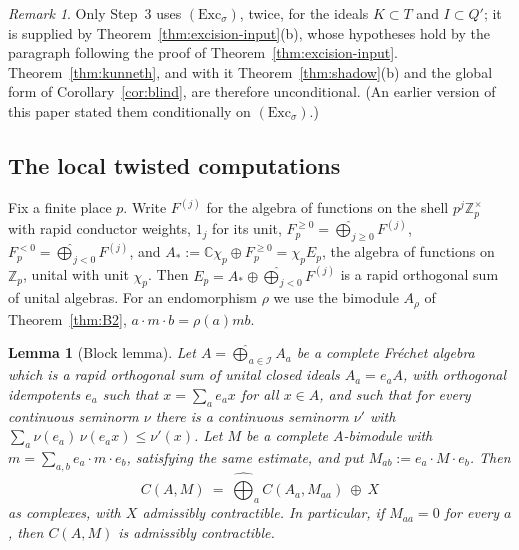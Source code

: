 \documentclass[11pt]{amsart}
\newtheorem{lemma}[theorem]{Lemma}
\theoremstyle{definition}
\theoremstyle{remark}
\newtheorem{remark}[theorem]{Remark}
\newcommand{\C}{\mathbb C}
\newcommand{\Z}{\mathbb Z}
\begin{document}
\begin{remark}\label{rem:kunnethstatus}
Only Step~3 uses $(\mathrm{Exc}_{\sigma})$, twice, for the ideals $K\subset T$
and $I\subset Q'$; it is supplied by Theorem~\ref{thm:excision-input}(b), whose
hypotheses hold by the paragraph following the proof of Theorem~\ref{thm:excision-input}.  Theorem~\ref{thm:kunneth}, and
with it Theorem~\ref{thm:shadow}(b) and the global form of
Corollary~\ref{cor:blind}, are therefore unconditional.  (An earlier version
of this paper stated them conditionally on $(\mathrm{Exc}_{\sigma})$.)
\end{remark}

\subsection{The local twisted computations}

Fix a finite place $p$.  Write $F^{(j)}$ for the algebra of functions on the
shell $p^{j}\Z_p^{\times}$ with rapid conductor weights, $1_j$ for its unit,
$F_p^{\ge0}=\widehat\bigoplus_{j\ge0}F^{(j)}$, $F_p^{<0}=\widehat\bigoplus_{j<0}
F^{(j)}$, and $A_*:=\C\chi_p\oplus F_p^{\ge0}=\chi_pE_p$, the algebra of
functions on $\Z_p$, unital with unit $\chi_p$.  Then $E_p=A_*\oplus
\widehat\bigoplus_{j<0}F^{(j)}$ is a rapid orthogonal sum of unital algebras.
For an endomorphism $\rho$ we use the bimodule $A_{\rho}$ of
Theorem~\ref{thm:B2}, $a\cdot m\cdot b=\rho(a)mb$.

\begin{lemma}[Block lemma]\label{lem:block}
Let $A=\widehat\bigoplus_{a\in\mathcal I}A_a$ be a complete Fr\'echet algebra
which is a rapid orthogonal sum of unital closed ideals $A_a=e_aA$, with
orthogonal idempotents $e_a$ such that $x=\sum_ae_ax$ for all $x\in A$, and
such that for every continuous seminorm $\nu$ there is a continuous seminorm
$\nu'$ with $\sum_a\nu(e_a)\,\nu(e_ax)\le\nu'(x)$.  Let $M$ be a complete
$A$-bimodule with $m=\sum_{a,b}e_a\cdot m\cdot e_b$, satisfying the same
estimate, and put $M_{ab}:=e_a\cdot M\cdot e_b$.  Then
\[
C(A,M)\ =\ \widehat\bigoplus_{a}C(A_a,M_{aa})\ \oplus\ X
\]
as complexes, with $X$ admissibly contractible.  In particular, if
$M_{aa}=0$ for every $a$, then $C(A,M)$ is admissibly contractible.
\end{lemma}
\end{document}
